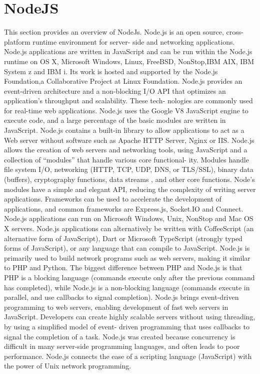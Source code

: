 \section{NodeJS}
\label{sec:nodejs}
This section provides an overview of NodeJs.
Node.js is an open source, cross-platform runtime environment for server- side and networking applications. Node.js applications are written in JavaScript and can be run within the Node.js runtime on OS X, Microsoft Windows, Linux, FreeBSD, NonStop,IBM AIX, IBM System z and IBM i. Its work is hosted and supported by the Node.js Foundation,a Collaborative Project at Linux Foundation.
\newline
Node.js provides an event-driven architecture and a non-blocking I/O API that optimizes an application’s throughput and scalability. These tech- nologies are commonly used for real-time web applications.
\newline
Node.js uses the Google V8 JavaScript engine to execute code, and a large percentage of the basic modules are written in JavaScript. Node.js contains a built-in library to allow applications to act as a Web server without software such as Apache HTTP Server, Nginx or IIS.
\newline
Node.js allows the creation of web servers and networking tools, using JavaScript and a collection of “modules” that handle various core functional- ity. Modules handle file system I/O, networking (HTTP, TCP, UDP, DNS, or TLS/SSL), binary data (buffers), cryptography functions, data streams , and other core functions. Node’s modules have a simple and elegant API, reducing the complexity of writing server applications.
Frameworks can be used to accelerate the development of applications, and common frameworks are Express.js, Socket.IO and Connect. Node.js applications can run on Microsoft Windows, Unix, NonStop and Mac OS X servers. Node.js applications can alternatively be written with CoffeeScript (an alternative form of JavaScript), Dart or Microsoft TypeScript (strongly typed forms of JavaScript), or any language that can compile to JavaScript.
Node.js is primarily used to build network programs such as web servers, making it similar to PHP and Python. The biggest difference between PHP and Node.js is that PHP is a blocking language (commands execute only after the previous command has completed), while Node.js is a non-blocking language (commands execute in parallel, and use callbacks to signal completion).
\newline
Node.js brings event-driven programming to web servers, enabling development of fast web servers in JavaScript. Developers can create highly scalable servers without using threading, by using a simplified model of event- driven programming that uses callbacks to signal the completion of a task. Node.js was created because concurrency is difficult in many server-side programming languages, and often leads to poor performance. Node.js connects the ease of a scripting language (JavaScript) with the power of Unix network programming.
